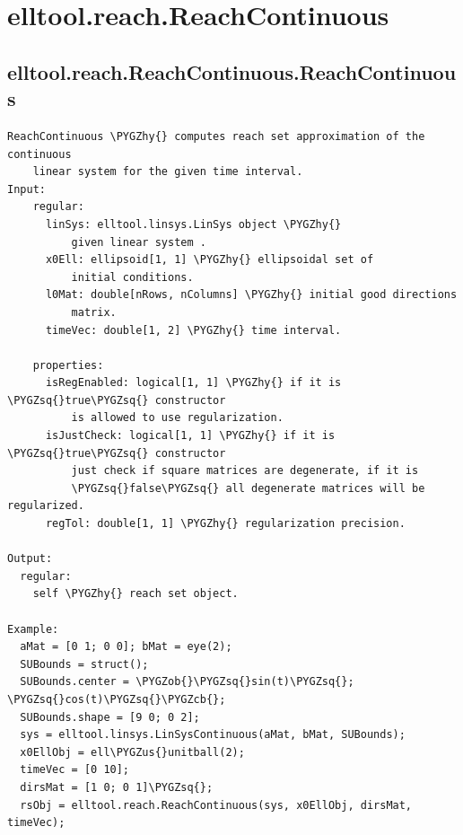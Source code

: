 \documentclass[letterpaper,10pt,english]{sphinxmanual}
\def\PYGZus{\char`\_}
\def\PYGZob{\char`\{}
\def\PYGZcb{\char`\}}
\def\PYGZhy{\char`\-}
\def\PYGZsq{\char`\'}
\begin{document}
\section{elltool.reach.ReachContinuous}
\label{chap_functions:elltool-reach-reachcontinuous}

\subsection{elltool.reach.ReachContinuous.ReachContinuous}
\label{chap_functions:elltool-reach-reachcontinuous-reachcontinuous}
\begin{Verbatim}[commandchars=\\\{\}]
ReachContinuous \PYGZhy{} computes reach set approximation of the continuous
    linear system for the given time interval.
Input:
    regular:
      linSys: elltool.linsys.LinSys object \PYGZhy{}
          given linear system .
      x0Ell: ellipsoid[1, 1] \PYGZhy{} ellipsoidal set of
          initial conditions.
      l0Mat: double[nRows, nColumns] \PYGZhy{} initial good directions
          matrix.
      timeVec: double[1, 2] \PYGZhy{} time interval.

    properties:
      isRegEnabled: logical[1, 1] \PYGZhy{} if it is \PYGZsq{}true\PYGZsq{} constructor
          is allowed to use regularization.
      isJustCheck: logical[1, 1] \PYGZhy{} if it is \PYGZsq{}true\PYGZsq{} constructor
          just check if square matrices are degenerate, if it is
          \PYGZsq{}false\PYGZsq{} all degenerate matrices will be regularized.
      regTol: double[1, 1] \PYGZhy{} regularization precision.

Output:
  regular:
    self \PYGZhy{} reach set object.

Example:
  aMat = [0 1; 0 0]; bMat = eye(2);
  SUBounds = struct();
  SUBounds.center = \PYGZob{}\PYGZsq{}sin(t)\PYGZsq{}; \PYGZsq{}cos(t)\PYGZsq{}\PYGZcb{};
  SUBounds.shape = [9 0; 0 2];
  sys = elltool.linsys.LinSysContinuous(aMat, bMat, SUBounds);
  x0EllObj = ell\PYGZus{}unitball(2);
  timeVec = [0 10];
  dirsMat = [1 0; 0 1]\PYGZsq{};
  rsObj = elltool.reach.ReachContinuous(sys, x0EllObj, dirsMat, timeVec);
\end{Verbatim}
\end{document}
